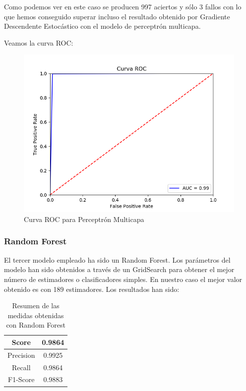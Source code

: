 Como podemos ver en este caso se producen 997 aciertos y sólo 3 fallos con lo que hemos conseguido superar incluso el resultado obtenido por Gradiente Descendente Estocástico con el modelo de perceptrón multicapa.

Veamos la curva ROC:

\begin{figure}[H] %
	\centering
	\includegraphics[scale=0.6]{ROC-NEURONAL.png}  %
	\caption{Curva ROC para Perceptrón Multicapa} 
	\label{fig:roc-pmc}
\end{figure}

\subsubsection{Random Forest}

El tercer modelo empleado ha sido un Random Forest. Los parámetros del modelo han sido obtenidos a través de un GridSearch para obtener el mejor número de estimadores o clasificadores simples. En nuestro caso el mejor valor obtenido es con 189 estimadores. Los resultados han sido:

\begin{table}[H]
	\centering
	\begin{tabular}{|c|c|}
		\hline
		Score     & 0.9864   \\ \hline
		Precision & 0.9925  \\ \hline
		Recall    & 0.9864   \\ \hline
		F1-Score  & 0.9883 \\ \hline
	\end{tabular}
	\caption{Resumen de las medidas obtenidas con Random Forest}
\end{table}

